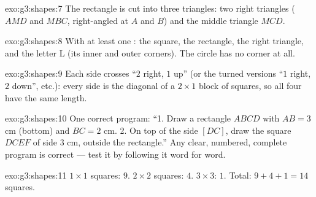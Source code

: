 \begin{solution}{exo:g3:shapes:7}
The rectangle is cut into three triangles: two right triangles
($AMD$ and $MBC$, right-angled at $A$ and $B$) and the middle
triangle $MCD$.
\end{solution}

\begin{solution}{exo:g3:shapes:8}
With at least one : the square, the rectangle, the right
triangle, and the letter L (its inner and outer corners). The circle
has no corner at all.
\end{solution}

\begin{solution}{exo:g3:shapes:9}
Each side crosses ``$2$ right, $1$ up'' (or the turned versions
``$1$ right, $2$ down'', etc.): every side is the diagonal of a
$2 \times 1$ block of squares, so all four have the same length.
\end{solution}

\begin{solution}{exo:g3:shapes:10}
One correct program: ``1. Draw a rectangle $ABCD$ with $AB = 3$ cm
(bottom) and $BC = 2$ cm. 2. On top of the side $[DC]$, draw the
square $DCEF$ of side $3$ cm, outside the rectangle.'' Any clear,
numbered, complete program is correct --- test it by following it
word for word.
\end{solution}

\begin{solution}{exo:g3:shapes:11}
$1 \times 1$ squares: $9$. $2 \times 2$ squares: $4$.
$3 \times 3$: $1$. Total: $9 + 4 + 1 = 14$ squares.
\end{solution}

